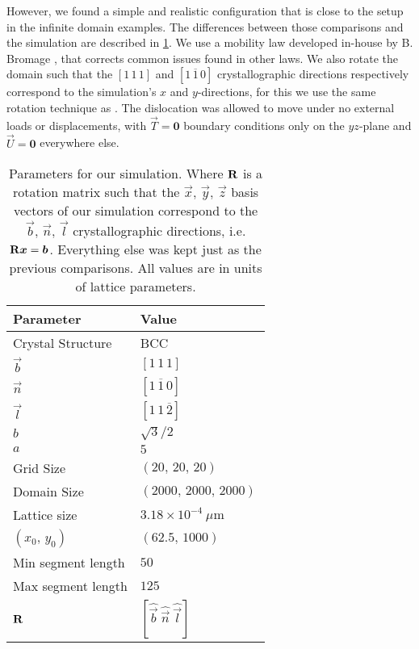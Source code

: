 However, we found a simple and realistic configuration that is close to the setup in the infinite domain examples. The differences between those comparisons and the simulation are described in \cref{t:simulation_params}. We use a mobility law developed in-house by B. Bromage \cite{bromage2018calculating}, that corrects common issues found in other laws. We also rotate the domain such that the $[1\, 1\, 1]$ and $[1\, \overline{1}\, 0]$ crystallographic directions respectively correspond to the simulation's $x$ and $y$-directions, for this we use the same rotation technique as \cite{YU2018}. The dislocation was allowed to move under no external loads or displacements, with $\vec{T} = \bm{0}$ boundary conditions only on the $yz$-plane and $\vec{U} = \bm{0}$ everywhere else.
\begin{table}
    \centering
    \caption[Numeric v.s. analytic tractions. Unloaded simulation comparison.]{Parameters for our simulation. Where $\mathbf{R}$ is a rotation matrix such that the $\vec{x},\, \vec{y},\, \vec{z}$ basis vectors of our simulation correspond to the $\vec{b},\, \vec{n},\, \vec{l}$ crystallographic directions, i.e. $\mtx{R} \vec{x} = \vec{b}$. Everything else was kept just as the previous comparisons. All values are in units of lattice parameters.}
    \label{t:simulation_params}
    \begin{tabular}{ll}
        \toprule
        Parameter          & Value                                           \\
        \midrule
        Crystal Structure  & BCC                                             \\
        $\vec{b}$          & $[1\, 1\, 1]$                                   \\
        $\vec{n}$          & $[1\, \overline{1}\, 0]$                        \\
        $\vec{l}$          & $[1\, 1\, \overline{2}]$                        \\
        $b$                & $\sqrt{3}/2$                                    \\
        $a$                & $5\, $                                          \\
        Grid Size          & $(20,\, 20,\, 20)$                              \\
        Domain Size        & $(2000,\, 2000,\, 2000)\, $                     \\
        Lattice size       & $3.18\times 10^{-4}~\mu\text{m}$                \\
        $(x_{0},\, y_{0})$ & $(62.5,\, 1000)\, $                             \\
        Min segment length & $50\, $                                         \\
        Max segment length & $125\, $                                        \\
        $\mathbf{R}$          & $[\hat{\vec{b}}~ \hat{\vec{n}}~ \hat{\vec{l}}]$ \\
        \bottomrule
    \end{tabular}
\end{table}

